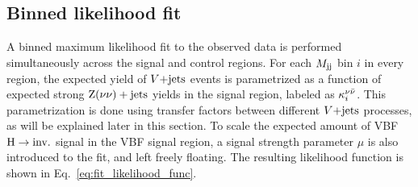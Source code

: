\subsection{Binned likelihood fit}
\label{subsec:likelihood_fit}

A binned maximum likelihood fit to the observed data is performed simultaneously across the 
signal and control regions. For each $M_{\textrm{jj}}$ bin $i$ in every region, the expected yield of $V\text{+jets}$ events
is parametrized as a function of expected strong $\textrm{Z}(\nu\nu)+\textrm{jets}$ yields in the signal region, labeled as
$\kappa_{i}^{\nu\bar{\nu}}$. This parametrization is done using transfer factors between different
$V\text{+jets}$ processes, as will be explained later in this section. To scale the expected amount of VBF
$\textrm{H} \rightarrow \textrm{inv.}$ signal in the VBF signal region, a signal strength parameter $\mu$ is also introduced to
the fit, and left freely floating. The resulting likelihood function is shown in Eq.~\ref{eq:fit_likelihood_func}.


% 
% 


